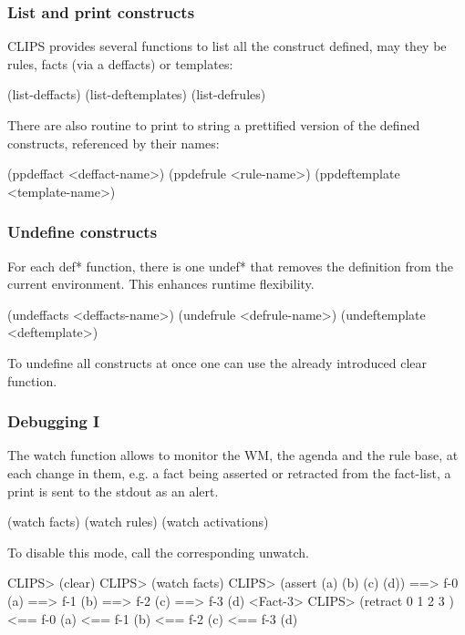 \documentclass[xcolor={usenames,dvipsnames,svgnames}, compress]{beamer}
\begin{document}
\begin{frame}[fragile]
  \frametitle{List and print constructs}
  CLIPS provides several functions to list all the construct defined,
  may they be rules, facts (via a deffacts) or templates:
  \begin{clips-code}
    (list-deffacts)
    (list-deftemplates)
    (list-defrules)
  \end{clips-code}\bigskip

  There are also routine to print to string a prettified version of
  the defined constructs, referenced by their names:

  \begin{clips-code}
    (ppdeffact <deffact-name>)
    (ppdefrule <rule-name>)
    (ppdeftemplate <template-name>)
  \end{clips-code}
\end{frame}

\begin{frame}[fragile]
  \frametitle{Undefine constructs}
  For each \textsf{def*} function, there is one \textsf{undef*} that
  removes the definition from the current environment. This enhances
  runtime flexibility.
  \begin{clips-code}[numbers=none]
    (undeffacts <deffacts-name>)
    (undefrule <defrule-name>)
    (undeftemplate <deftemplate>)
  \end{clips-code}\bigskip
  
  To undefine all constructs at once one can use the already
  introduced \textsf{clear} function.
\end{frame}

\begin{frame}[fragile]
  \frametitle{Debugging I}
  The \textsf{watch} function allows to monitor the WM, the agenda and the
  rule base, at each change in them, e.g. a fact being asserted or
  retracted from the \textsf{fact-list}, a print is sent to the stdout
  as an alert.
  \begin{clips-code}[numbers=none]
    (watch facts)    (watch rules)    (watch activations)
  \end{clips-code}

  To disable this mode, call the corresponding \textsf{unwatch}.
  \begin{clips-code}
    CLIPS> (clear)
    CLIPS> (watch facts)
    CLIPS> (assert (a) (b) (c) (d))
    ==> f-0     (a)
    ==> f-1     (b)
    ==> f-2     (c)
    ==> f-3     (d)
    <Fact-3>
    CLIPS> (retract 0 1 2 3 )
    <== f-0     (a)
    <== f-1     (b)
    <== f-2     (c)
    <== f-3     (d)
  \end{clips-code}
\end{frame}
\end{document}
